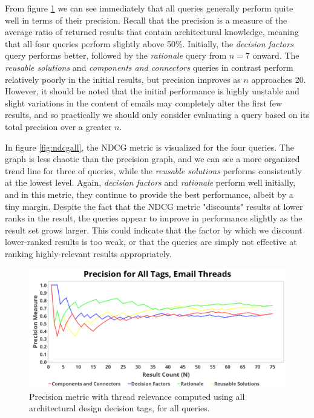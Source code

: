 \documentclass[a4paper, 12pt]{article}
\begin{document}
		From figure \ref{fig:precisionall} we can see immediately that all queries generally perform quite well in terms of their precision. Recall that the precision is a measure of the average ratio of returned results that contain architectural knowledge, meaning that all four queries perform slightly above 50\%. Initially, the \textit{decision factors} query performs better, followed by the \textit{rationale} query from $ n = 7 $ onward. The \textit{reusable solutions} and \textit{components and connectors} queries in contrast perform relatively poorly in the initial results, but precision improves as $ n $ approaches 20. However, it should be noted that the initial performance is highly unstable and slight variations in the content of emails may completely alter the first few results, and so practically we should only consider evaluating a query based on its total precision over a greater $ n $.
		
		In figure \ref{fig:ndcgall}, the NDCG metric is visualized for the four queries. The graph is less chaotic than the precision graph, and we can see a more organized trend line for three of queries, while the \textit{reusable solutions} performs consistently at the lowest level. Again, \textit{decision factors} and \textit{rationale} perform well initially, and in this metric, they continue to provide the best performance, albeit by a tiny margin. Despite the fact that the NDCG metric "discounts" results at lower ranks in the result, the queries appear to improve in performance slightly as the result set grows larger. This could indicate that the factor by which we discount lower-ranked results is too weak, or that the queries are simply not effective at ranking highly-relevant results appropriately.
		
		\begin{figure}[H]
			\centering
			\includegraphics[width=\textwidth]{report/all_tags_thread_precision.png}
			\caption{Precision metric with thread relevance computed using all architectural design decision tags, for all queries.}
			\label{fig:precisionall}
		\end{figure}
		
\end{document}
